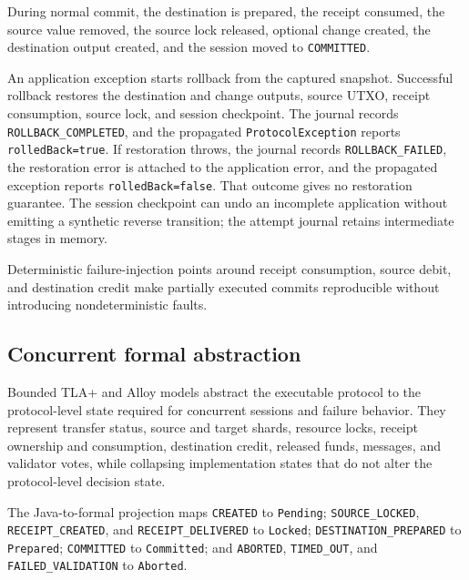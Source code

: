 During normal commit, the destination is prepared, the receipt consumed, the
source value removed, the source lock released, optional change created, the
destination output created, and the session moved to \texttt{COMMITTED}.

An application exception starts rollback from the captured snapshot. Successful
rollback restores the destination and change outputs, source UTXO, receipt
consumption, source lock, and session checkpoint. The journal records
\texttt{ROLLBACK\_COMPLETED}, and the propagated \texttt{ProtocolException}
reports \texttt{rolledBack=true}. If restoration throws, the journal records
\texttt{ROLLBACK\_FAILED}, the restoration error is attached to the application
error, and the propagated exception reports \texttt{rolledBack=false}.
That outcome gives no restoration guarantee. The session checkpoint can undo
an incomplete application without emitting a synthetic reverse transition;
the attempt journal retains intermediate stages in memory.

Deterministic failure-injection points around receipt consumption, source debit,
and destination credit make partially executed commits reproducible without
introducing nondeterministic faults.

\subsection{Concurrent formal abstraction}
\label{subsec:formal-abstraction}



Bounded TLA+ and Alloy models abstract the executable protocol to the
protocol-level state required for concurrent sessions and failure behavior. They
represent transfer status, source and target shards, resource locks, receipt
ownership and consumption, destination credit, released funds, messages, and
validator votes, while collapsing implementation states that do not alter the
protocol-level decision state.

\begingroup\raggedright
The Java-to-formal projection maps \texttt{CREATED} to \texttt{Pending};
\texttt{SOURCE\_\allowbreak LOCKED}, \texttt{RECEIPT\_\allowbreak CREATED}, and
\texttt{RECEIPT\_\allowbreak DELIVERED} to \texttt{Locked};
\texttt{DESTINATION\_\allowbreak PREPARED} to \texttt{Prepared};
\texttt{COMMITTED} to \texttt{Committed}; and \texttt{ABORTED},
\texttt{TIMED\_\allowbreak OUT}, and \texttt{FAILED\_\allowbreak VALIDATION} to
\texttt{Aborted}.
\par\endgroup

